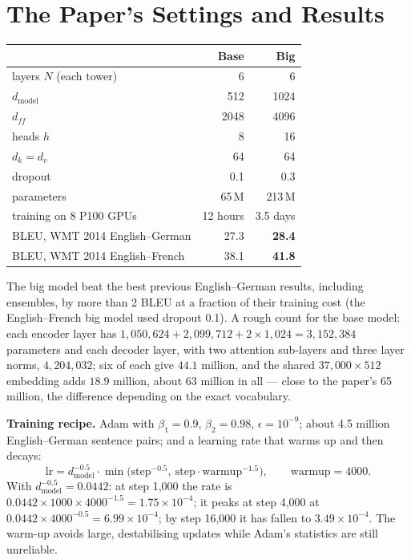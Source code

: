 \documentclass[11pt]{article}
\begin{document}
\section{The Paper's Settings and Results}
\begin{center}\small\renewcommand{\arraystretch}{1.2}
\begin{tabular}{lrr}\toprule
 & \textbf{Base} & \textbf{Big}\\\midrule
layers $N$ (each tower) & 6 & 6\\
$d_{\text{model}}$ & 512 & 1024\\
$d_{ff}$ & 2048 & 4096\\
heads $h$ & 8 & 16\\
$d_k=d_v$ & 64 & 64\\
dropout & 0.1 & 0.3\\
parameters & 65\,M & 213\,M\\
training on 8 P100 GPUs & 12 hours & 3.5 days\\\midrule
BLEU, WMT 2014 English--German & 27.3 & \textbf{28.4}\\
BLEU, WMT 2014 English--French & 38.1 & \textbf{41.8}\\\bottomrule
\end{tabular}\end{center}
The big model beat the best previous English--German results, including ensembles, by more than 2 BLEU at a fraction of their training cost (the English--French big model used dropout 0.1). A rough count for the base model: each encoder layer has $1{,}050{,}624+2{,}099{,}712+2\times1{,}024=3{,}152{,}384$ parameters and each decoder layer, with two attention sub-layers and three layer norms, $4{,}204{,}032$; six of each give $44.1$ million, and the shared $37{,}000\times512$ embedding adds $18.9$ million, about 63 million in all --- close to the paper's 65 million, the difference depending on the exact vocabulary.

\textbf{Training recipe.} Adam with $\beta_1=0.9$, $\beta_2=0.98$, $\epsilon=10^{-9}$; about 4.5 million English--German sentence pairs; and a learning rate that warms up and then decays:
\[\text{lr}=d_{\text{model}}^{-0.5}\cdot\min\!\big(\text{step}^{-0.5},\ \text{step}\cdot\text{warmup}^{-1.5}\big),\qquad \text{warmup}=4000.\]
With $d_{\text{model}}^{-0.5}=0.0442$: at step 1,000 the rate is $0.0442\times1000\times4000^{-1.5}=1.75\times10^{-4}$; it peaks at step 4,000 at $0.0442\times4000^{-0.5}=6.99\times10^{-4}$; by step 16,000 it has fallen to $3.49\times10^{-4}$. The warm-up avoids large, destabilising updates while Adam's statistics are still unreliable.
\end{document}
